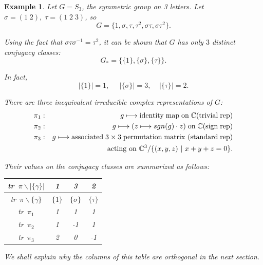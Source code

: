 \documentclass[12pt]{article}
\newtheorem{example}[theorem]{Example}
\def\ccc{\mathbb{C}}
\begin{document}
\begin{example}
Let $G=S_3$, the symmetric group on 3 letters. Let 
$\sigma =(1\;2),\;\tau =(1\;2\;3)$, so
\[
G=\{1,\sigma ,\tau ,\tau ^2,\sigma \tau ,\sigma \tau ^2\}.
\]

Using the fact that $\sigma \tau \sigma ^{-1}=\tau ^2$, it can be shown that 
$G$ has only $3$ distinct conjugacy classes:
\[
G_{*}=\{\{1\},\{\sigma \},\{\tau \}\}.
\]

In fact, 
\[
|\{1\}|=1,\;\;\;\;\;|\{\sigma \}|=3,\;\;\;\;|\{\tau \}|=2.
\]

There are three inequivalent irreducible complex representations of $G$:
\begin{eqnarray*}
\pi _1 &:&g\longmapsto \mathrm{identity\;map\;on}\;\ccc
\mathrm{(trivial\;rep)} \\
\pi _2 &:&g\longmapsto (z\longmapsto sgn(g)\cdot z)\;\mathrm{on}\;
\ccc\mathrm{(sign\;rep)} \\
\pi _3 &:&g\longmapsto \mathrm{associated}\;3\times 3\;\mathrm{permutation\;matrix}
\ \mathrm{(standard\;rep)}\\
 & &\ \ \ \ \ \ \ \ \ \ \ \ \  {\rm acting\ on\ }
\ccc^3/\{(x,y,z)\ |\ x+y+z=0\}.
\end{eqnarray*}

Their values on the conjugacy classes are summarized as follows:
\begin{center}
\begin{tabular}{|c|c|c|c|} \hline
tr\ $\pi\backslash |\{\gamma\}|$& 1 & 3 & 2 \\ \hline
tr\ $\pi\backslash \{\gamma\}$& $\{1\}$ & $\{\sigma \}$ & $\{\tau \}$ \\ \hline
tr\ $\pi _1$ & 1 & 1 & 1 \\ 
tr\ $\pi _2$ & 1 & -1 & 1 \\ 
tr\ $\pi _3$ & 2 & 0 & -1\\ \hline
\end{tabular}
\end{center}
We shall explain why the columns of this table are orthogonal in the 
next section.

\end{example}
\end{document}
